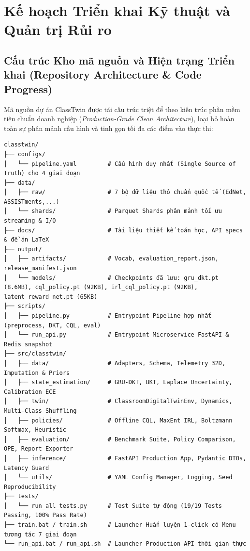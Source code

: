 \section{Kế hoạch Triển khai Kỹ thuật và Quản trị Rủi ro}\label{sec:trien-khai-rui-ro}

\subsection{Cấu trúc Kho mã nguồn và Hiện trạng Triển khai (Repository Architecture \& Code Progress)}\label{subsec:repo-structure}
Mã nguồn dự án ClassTwin được tái cấu trúc triệt để theo kiến trúc phần mềm tiêu chuẩn doanh nghiệp (\textit{Production-Grade Clean Architecture}), loại bỏ hoàn toàn sự phân mảnh cấu hình và tinh gọn tối đa các điểm vào thực thi:

\begin{tcolorbox}[colback=white, colframe=NavyBlue, boxrule=0.8pt, arc=3pt]
\begin{verbatim}
classtwin/
├── configs/
│   └── pipeline.yaml         # Cấu hình duy nhất (Single Source of Truth) cho 4 giai đoạn
├── data/
│   ├── raw/                  # 7 bộ dữ liệu thô chuẩn quốc tế (EdNet, ASSISTments,...)
│   └── shards/               # Parquet Shards phân mảnh tối ưu streaming & I/O
├── docs/                     # Tài liệu thiết kế toán học, API specs & đề án LaTeX
├── output/
│   ├── artifacts/            # Vocab, evaluation_report.json, release_manifest.json
│   └── models/               # Checkpoints đã lưu: gru_dkt.pt (8.6MB), cql_policy.pt (92KB), irl_cql_policy.pt (92KB), latent_reward_net.pt (65KB)
├── scripts/
│   ├── pipeline.py           # Entrypoint Pipeline hợp nhất (preprocess, DKT, CQL, eval)
│   └── run_api.py            # Entrypoint Microservice FastAPI & Redis snapshot
├── src/classtwin/
│   ├── data/                 # Adapters, Schema, Telemetry 32D, Imputation & Priors
│   ├── state_estimation/     # GRU-DKT, BKT, Laplace Uncertainty, Calibration ECE
│   ├── twin/                 # ClassroomDigitalTwinEnv, Dynamics, Multi-Class Shuffling
│   ├── policies/             # Offline CQL, MaxEnt IRL, Boltzmann Softmax, Heuristic
│   ├── evaluation/           # Benchmark Suite, Policy Comparison, OPE, Report Exporter
│   ├── inference/            # FastAPI Production App, Pydantic DTOs, Latency Guard
│   └── utils/                # YAML Config Manager, Logging, Seed Reproducibility
├── tests/
│   └── run_all_tests.py      # Test Suite tự động (19/19 Tests Passing, 100% Pass Rate)
├── train.bat / train.sh      # Launcher Huấn luyện 1-click có Menu tương tác 7 giai đoạn
└── run_api.bat / run_api.sh  # Launcher Production API thời gian thực
\end{verbatim}
\end{tcolorbox}

